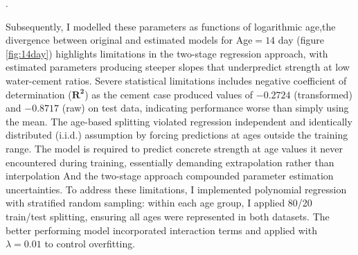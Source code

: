 .\documentclass[a4paper,11pt]{article}
\begin{document}
\vspace{-8pt}
Subsequently, I modelled these parameters as functions of logarithmic age,the divergence between original and estimated models for Age$=14$ day (figure \ref{fig:14day})  highlights limitations in the two-stage regression approach, with estimated parameters producing steeper slopes that underpredict strength at low water-cement ratios.  Severe statistical limitations includes negative coefficient of determination ($\mathbf{R^2}$) as the cement case produced values of $-0.2724$ (transformed) and $-0.8717$ (raw) on test data, indicating performance worse than simply using the mean. The age-based splitting violated regression independent and identically distributed (i.i.d.) assumption by forcing predictions at ages outside the training range. The model is required to predict concrete strength at age values it never encountered during training, essentially demanding extrapolation rather than interpolation And the two-stage approach compounded parameter estimation uncertainties. To address these limitations, I implemented polynomial regression with stratified random sampling: within each age group, I applied 80/20 train/test splitting, ensuring all ages were represented in both datasets. The better performing model incorporated   interaction terms and applied with $\lambda = 0.01$ to control overfitting. 
 
\end{document}
